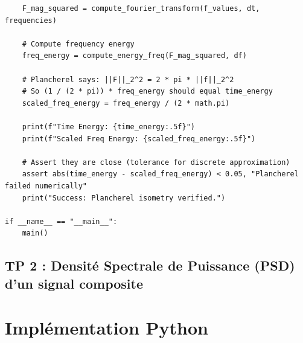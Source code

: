 \documentclass[11pt,a4paper]{article}
\begin{document}
\begin{lstlisting}
    F_mag_squared = compute_fourier_transform(f_values, dt, frequencies)

    # Compute frequency energy
    freq_energy = compute_energy_freq(F_mag_squared, df)

    # Plancherel says: ||F||_2^2 = 2 * pi * ||f||_2^2
    # So (1 / (2 * pi)) * freq_energy should equal time_energy
    scaled_freq_energy = freq_energy / (2 * math.pi)

    print(f"Time Energy: {time_energy:.5f}")
    print(f"Scaled Freq Energy: {scaled_freq_energy:.5f}")

    # Assert they are close (tolerance for discrete approximation)
    assert abs(time_energy - scaled_freq_energy) < 0.05, "Plancherel failed numerically"
    print("Success: Plancherel isometry verified.")

if __name__ == "__main__":
    main()
\end{lstlisting}


\subsection*{TP 2 : Densité Spectrale de Puissance (PSD) d'un signal composite}

\section{Implémentation Python}
\end{document}
